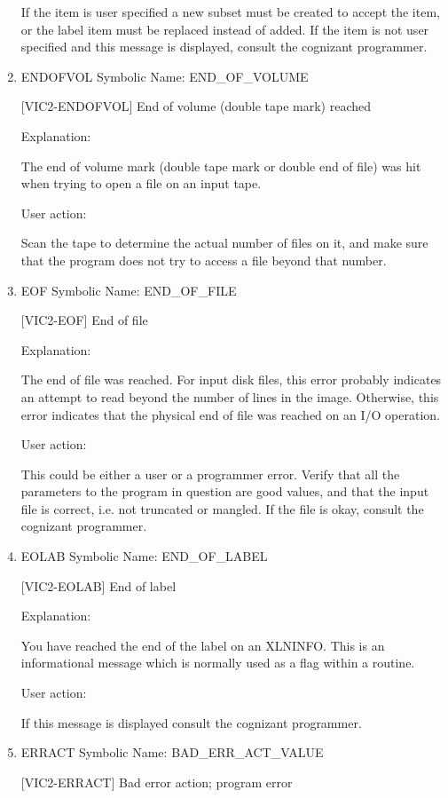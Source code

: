 \begin{enumerate}
If the item is user specified a new subset must be created to
accept the item, or the label item must be replaced instead of
added.  If the item is not user specified and this message is
displayed, consult the cognizant programmer.


\item ENDOFVOL Symbolic Name: END\_OF\_VOLUME

[VIC2-ENDOFVOL] End of volume (double tape mark) reached

Explanation:

The end of volume mark (double tape mark or double end of
file) was hit when trying to open a file on an input tape.

User action:

Scan the tape to determine the actual number of files on it,
and make sure that the program does not try to access a file
beyond that number.


\item EOF Symbolic Name: END\_OF\_FILE

[VIC2-EOF] End of file


Explanation:

The end of file was reached.  For input disk files, this error
probably indicates an attempt to read beyond the number of lines
in the image.  Otherwise, this  error indicates that the physical
end of file was reached on an I/O operation.

User action:

This could be either a user or a programmer error.  Verify that
all the parameters to the program in question are good values,
and that the input file is correct, i.e. not truncated or
mangled.  If the file is okay, consult the cognizant programmer.


\item EOLAB Symbolic Name: END\_OF\_LABEL

[VIC2-EOLAB] End of label

Explanation:

You have reached the end of the label on an XLNINFO.  This is an
informational message which is normally used as a flag within a routine.

User action:

If this message is displayed consult the cognizant programmer.


\item ERRACT Symbolic Name: BAD\_ERR\_ACT\_VALUE

[VIC2-ERRACT] Bad error action; program error


\end{enumerate}
